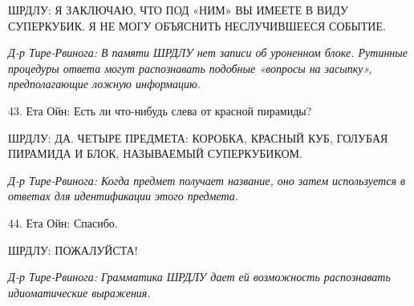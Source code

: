ШРДЛУ: Я ЗАКЛЮЧАЮ, ЧТО ПОД «НИМ» ВЫ ИМЕЕТЕ В ВИДУ СУПЕРКУБИК. Я НЕ МОГУ ОБЪЯСНИТЬ НЕСЛУЧИВШЕЕСЯ СОБЫТИЕ.

\emph{Д-р Тире-Рвинога: В памяти ШРДЛУ нет записи об уроненном блоке. Рутинные процедуры ответа могут распознавать подобные «вопросы на засыпку», предполагающие ложную информацию.}

43. Ета Ойн: Есть ли что-нибудь слева от красной пирамиды?

ШРДЛУ: ДА. ЧЕТЫРЕ ПРЕДМЕТА: КОРОБКА, КРАСНЫЙ КУБ, ГОЛУБАЯ ПИРАМИДА И БЛОК, НАЗЫВАЕМЫЙ СУПЕРКУБИКОМ.

\emph{Д-р Тире-Рвинога: Когда предмет получает название, оно затем используется в ответах для идентификации этого предмета.}

44. Ета Ойн: Спасибо.

ШРДЛУ: ПОЖАЛУЙСТА!

\emph{Д-р Тире-Рвинога: Грамматика ШРДЛУ дает ей возможность распознавать идиоматические выражения.}

